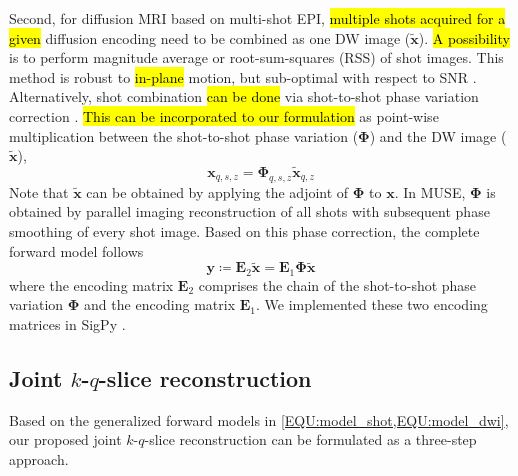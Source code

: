 \documentclass[preprint,12pt,authoryear,review]{elsarticle}
\begin{document}
    Second, for diffusion MRI based on multi-shot EPI,
    \hl{multiple shots acquired for a given} diffusion encoding
    need to be combined as one DW image ($\mathbf{\tilde{x}}$).
    \hl{A possibility} is to perform magnitude average \citep{chen_2013_muse}
    or root-sum-squares (RSS) \citep{mani_2017_mussels}
    of shot images.
    This method is robust to \hl{in-plane} motion, 
    but sub-optimal with respect to SNR
    \citep{guhaniyogi_2016_amuse}.
    Alternatively, shot combination \hl{can be done} 
    via shot-to-shot phase variation correction
    \citep{liu_2005_moco_diff,chen_2013_muse}.
    \hl{This can be incorporated to our formulation} 
    as point-wise multiplication
    between the shot-to-shot phase variation ($\mathbf{\Phi}$) and
    the DW image ($\mathbf{\tilde{x}}$),
    \begin{equation}
         \mathbf{x}_{q,s,z} = \mathbf{\Phi}_{q,s,z} \mathbf{\tilde{x}}_{q,z}
    \end{equation}
    Note that $\mathbf{\tilde{x}}$ can be obtained
    by applying the adjoint of $\mathbf{\Phi}$ to $\mathbf{x}$.
    In MUSE, $\mathbf{\Phi}$ is obtained by parallel imaging reconstruction of all shots
    with subsequent phase smoothing of every shot image.
    Based on this phase correction, the complete forward model follows
    \begin{equation}
        \mathbf{y} \coloneqq \mathbf{E}_2 \mathbf{\tilde{x}} = \mathbf{E}_1 \mathbf{\Phi} \mathbf{\tilde{x}}
        \label{EQU:model_dwi}
    \end{equation}
    where the encoding matrix $\mathbf{E}_2$ comprises the chain of
    the shot-to-shot phase variation $\mathbf{\Phi}$ and
    the encoding matrix $\mathbf{E}_1$.
    We implemented these two encoding matrices in SigPy \citep{ong_2019_sigpy}.


    \subsection{Joint $k$-$q$-slice reconstruction}

    Based on the generalized forward models in \cref{EQU:model_shot,EQU:model_dwi},
    our proposed joint $k$-$q$-slice reconstruction can be formulated as a three-step approach.
\end{document}
